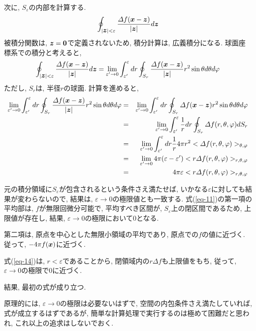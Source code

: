 \documentclass{jsarticle} \usepackage[dvipdfmx]{graphicx} \usepackage[dvipdfmx]{hyperref}
\newcommand*{\mbold}[1]{\mbox{\boldmath $#1$}}
\begin{document}
次に, $S_\varepsilon$の内部を計算する. 
\begin{equation}
  \oint_{|\mbold{z}| < \varepsilon} \frac{\varDelta f(\mbold{x} - \mbold{z})}{|\mbold{z}|}d\mbold{z}
\end{equation}
被積分関数は, $\mbold{z} = \mbold{0}$で定義されないため, 積分計算は, 広義積分になる. 
球面座標系での積分と考えると, 
\begin{equation}
  \oint_{|\mbold{z}| < \varepsilon} \frac{\varDelta f(\mbold{x} - \mbold{z})}{|\mbold{z}|}d\mbold{z}
  =
  \lim_{\varepsilon^\prime \to 0}\int_{\varepsilon^\prime}^\varepsilon dr \oint_{S_r} \frac{\varDelta f(\mbold{x} - \mbold{z})}{|\mbold{z}|} r^2 \sin\theta d\theta d\varphi 
\end{equation}
ただし, $S_r$は, 半径$r$の球面. 
計算を進めると, 
\begin{eqnarray}\label{eq-14}
  \lim_{\varepsilon^\prime \to 0}\int_{\varepsilon^\prime}^\varepsilon dr \oint_{S_r} \frac{\varDelta f(\mbold{x} - \mbold{z})}{|\mbold{z}|} r^2 \sin\theta d\theta d\varphi 
  &=&
  \lim_{\varepsilon^\prime \to 0}\int_{\varepsilon^\prime}^\varepsilon dr \oint_{S_r} \varDelta f(\mbold{x} - \mbold{z}) r^2 \sin\theta d\theta d\varphi 
  \nonumber \\
  &=&
  \lim_{\varepsilon^\prime \to 0}\int_{\varepsilon^\prime}^\varepsilon \frac{1}{r} dr \oint_{S_r} \varDelta f(r, \theta, \varphi) dS_r
  \nonumber \\
  &=&
  \lim_{\varepsilon^\prime \to 0}\int_{\varepsilon^\prime}^\varepsilon dr \frac{1}{r} 4\pi r^2 <\varDelta f(r, \theta, \varphi)>_{\theta, \varphi} 
  \nonumber \\
  &=&
  \lim_{\varepsilon^\prime \to 0}4 \pi (\varepsilon - \varepsilon^\prime) <r \varDelta f(r, \theta, \varphi)>_{r, \theta, \varphi} 
  \nonumber \\
  &=&
  4 \pi \varepsilon <r \varDelta f(r, \theta, \varphi)>_{r, \theta, \varphi} 
\end{eqnarray}

元の積分領域に$S_\varepsilon$が包含されるという条件さえ満たせば, いかなる$\varepsilon$に対しても結果が変わらないので, 結果は, $\varepsilon \rightarrow 0$の極限値とも一致する. 
式(\ref{eq-11})の第一項の平均部は, $f$が無限回微分可能で, 平均すべき区間が, $S_\varepsilon$上の閉区間であるため, 上限値が存在し, 結果, $\varepsilon \rightarrow 0$の極限において$0$となる. 

第二項は, 原点を中心とした無限小領域の平均であり, 原点での$f$の値に近づく. 
従って, $-4\pi f(\mbold{x})$に近づく. 

式(\ref{eq-14})は, $r < \varepsilon$であることから, 閉領域内の$r\varDelta f$も上限値をもち, 従って, $\varepsilon \rightarrow 0$の極限で$0$に近づく. 

結果, 最初の式が成り立つ. 

原理的には, $\varepsilon \rightarrow 0$の極限は必要ないはずで, 空間の内包条件さえ満たしていれば, 式が成立するはずであるが, 簡単な計算処理で実行するのは極めて困難だと思われ, これ以上の追求はしないでおく. 
\end{document}
